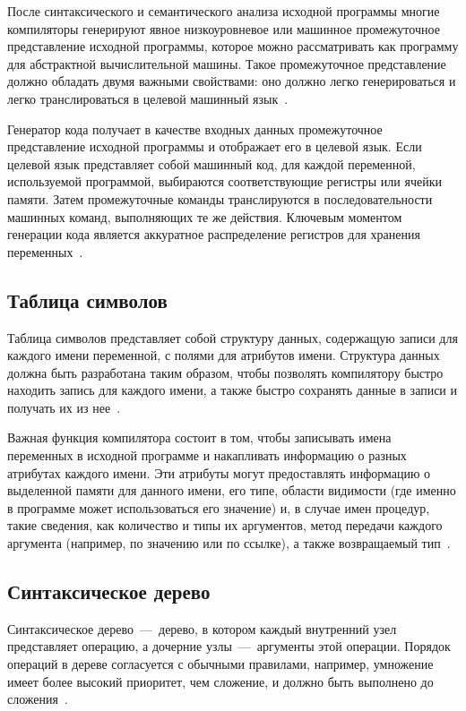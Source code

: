 После синтаксического и семантического анализа исходной программы многие компиляторы генерируют явное низкоуровневое или машинное промежуточное представление исходной программы, которое можно рассматривать как программу для абстрактной вычислительной машины. Такое промежуточное представление должно обладать двумя важными свойствами: оно должно легко генерироваться и легко транслироваться в целевой машинный язык~\cite{aho2003}.

Генератор кода получает в качестве входных данных промежуточное представление исходной программы и отображает его в целевой язык. Если целевой язык представляет собой машинный код, для каждой переменной, используемой программой, выбираются соответствующие регистры или ячейки памяти. Затем промежуточные команды транслируются в последовательности машинных команд, выполняющих те же действия. Ключевым моментом генерации кода является аккуратное распределение регистров для хранения переменных~\cite{aho2003}.

\subsection{Таблица символов}

Таблица символов представляет собой структуру данных, содержащую записи для каждого имени переменной, с полями для атрибутов имени. Структура данных должна быть разработана таким образом, чтобы позволять компилятору быстро находить запись для каждого имени, а также быстро сохранять данные в записи и получать их из нее~\cite{aho2003}.

Важная функция компилятора состоит в том, чтобы записывать имена переменных в исходной программе и накапливать информацию о разных атрибутах каждого имени. Эти атрибуты могут предоставлять информацию о выделенной памяти для данного имени, его типе, области видимости (где именно в программе может использоваться его значение) и, в случае имен процедур, такие сведения, как количество и типы их аргументов, метод передачи каждого аргумента (например, по значению или по ссылке), а также возвращаемый тип~\cite{aho2003}.



\subsection{Синтаксическое дерево}

Синтаксическое дерево~---~дерево, в котором каждый внутренний узел представляет операцию, а дочерние узлы~---~аргументы этой операции. Порядок операций в дереве согласуется с обычными правилами, например, умножение имеет более высокий приоритет, чем сложение, и должно быть выполнено до сложения~\cite{serebrykov2001}.

